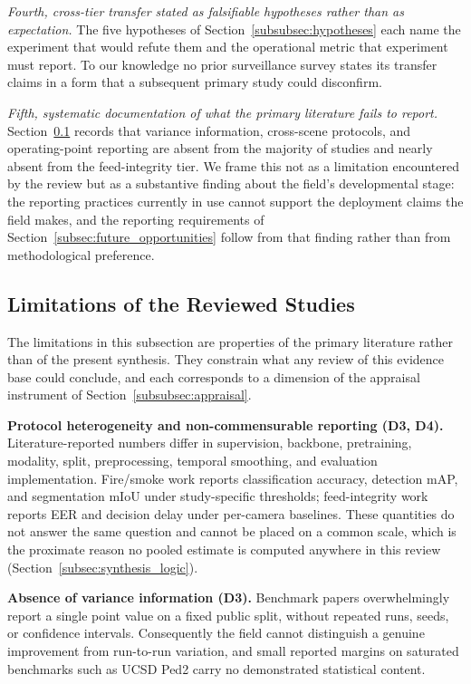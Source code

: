 \documentclass[10pt,a4paper]{article}
\begin{document}
\emph{Fourth, cross-tier transfer stated as falsifiable hypotheses rather than as expectation.} The five hypotheses of Section~\ref{subsubsec:hypotheses} each name the experiment that would refute them and the operational metric that experiment must report. To our knowledge no prior surveillance survey states its transfer claims in a form that a subsequent primary study could disconfirm.

\emph{Fifth, systematic documentation of what the primary literature fails to report.} Section~\ref{subsec:threats_studies} records that variance information, cross-scene protocols, and operating-point reporting are absent from the majority of studies and nearly absent from the feed-integrity tier. We frame this not as a limitation encountered by the review but as a substantive finding about the field's developmental stage: the reporting practices currently in use cannot support the deployment claims the field makes, and the reporting requirements of Section~\ref{subsec:future_opportunities} follow from that finding rather than from methodological preference.

\subsection{Limitations of the Reviewed Studies}
\label{subsec:threats_studies}

The limitations in this subsection are properties of the primary literature rather than of the present synthesis. They constrain what any review of this evidence base could conclude, and each corresponds to a dimension of the appraisal instrument of Section~\ref{subsubsec:appraisal}.

\textbf{Protocol heterogeneity and non-commensurable reporting (D3, D4).} Literature-reported numbers differ in supervision, backbone, pretraining, modality, split, preprocessing, temporal smoothing, and evaluation implementation. Fire/smoke work reports classification accuracy, detection mAP, and segmentation mIoU under study-specific thresholds; feed-integrity work reports EER and decision delay under per-camera baselines. These quantities do not answer the same question and cannot be placed on a common scale, which is the proximate reason no pooled estimate is computed anywhere in this review (Section~\ref{subsec:synthesis_logic}).

\textbf{Absence of variance information (D3).} Benchmark papers overwhelmingly report a single point value on a fixed public split, without repeated runs, seeds, or confidence intervals. Consequently the field cannot distinguish a genuine improvement from run-to-run variation, and small reported margins on saturated benchmarks such as UCSD Ped2 carry no demonstrated statistical content.
\end{document}
